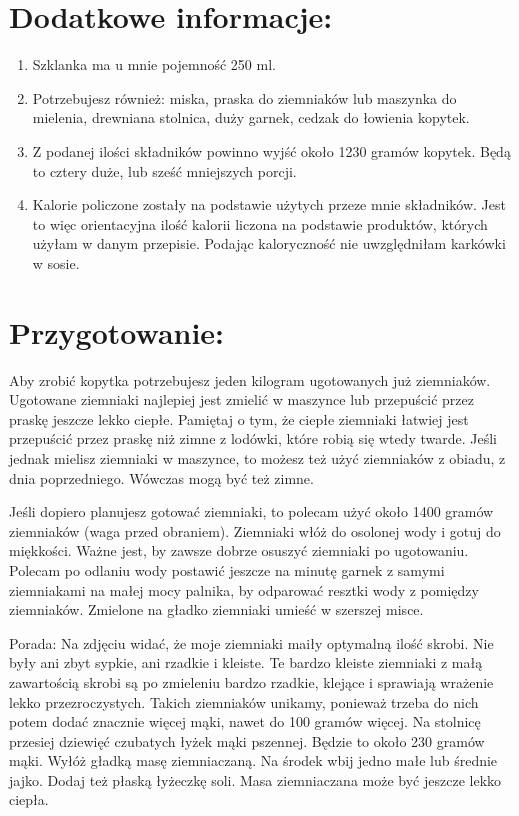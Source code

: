 \documentclass[12pt, letterpaper, titlepage]{article}
\begin{document}
\section{Dodatkowe informacje:}

\begin{enumerate}
\item Szklanka ma u mnie pojemność 250 ml. 
\item Potrzebujesz również: miska, praska do ziemniaków lub maszynka do mielenia, drewniana stolnica, duży garnek, cedzak do łowienia kopytek.
\item Z podanej ilości składników powinno wyjść około 1230 gramów kopytek. Będą to cztery duże, lub sześć mniejszych porcji.
\item Kalorie policzone zostały na podstawie użytych przeze mnie składników. Jest to więc orientacyjna ilość kalorii liczona na podstawie produktów, których użyłam w danym przepisie. Podając kaloryczność nie uwzględniłam karkówki w sosie.

\end{enumerate}

\section{Przygotowanie:}
Aby zrobić kopytka potrzebujesz jeden kilogram ugotowanych już ziemniaków. Ugotowane ziemniaki najlepiej jest zmielić w maszynce lub przepuścić przez praskę jeszcze lekko ciepłe. Pamiętaj o tym, że ciepłe ziemniaki łatwiej jest przepuścić przez praskę niż zimne z lodówki, które robią się wtedy twarde. Jeśli jednak mielisz ziemniaki w maszynce, to możesz też użyć ziemniaków z obiadu, z dnia poprzedniego. Wówczas mogą być też zimne. 

Jeśli dopiero planujesz gotować ziemniaki, to polecam użyć około 1400 gramów ziemniaków (waga przed obraniem). Ziemniaki włóż do osolonej wody i gotuj do miękkości. Ważne jest, by zawsze dobrze osuszyć ziemniaki po ugotowaniu. Polecam po odlaniu wody postawić jeszcze na minutę garnek z samymi ziemniakami na małej mocy palnika, by odparować resztki wody z pomiędzy ziemniaków. Zmielone na gładko ziemniaki umieść w szerszej misce.

Porada: Na zdjęciu widać, że moje ziemniaki maiły optymalną ilość skrobi. Nie były ani zbyt sypkie, ani rzadkie i kleiste. Te bardzo kleiste ziemniaki z małą zawartością skrobi są po zmieleniu bardzo rzadkie, klejące i sprawiają wrażenie lekko przezroczystych. Takich ziemniaków unikamy, ponieważ trzeba do nich potem dodać znacznie więcej mąki, nawet do 100 gramów więcej. 
Na stolnicę przesiej dziewięć czubatych łyżek mąki pszennej. Będzie to około 230 gramów mąki. Wyłóż gładką masę ziemniaczaną. Na środek wbij jedno małe lub średnie jajko. Dodaj też płaską łyżeczkę soli. Masa ziemniaczana może być jeszcze lekko ciepła.
\end{document}
